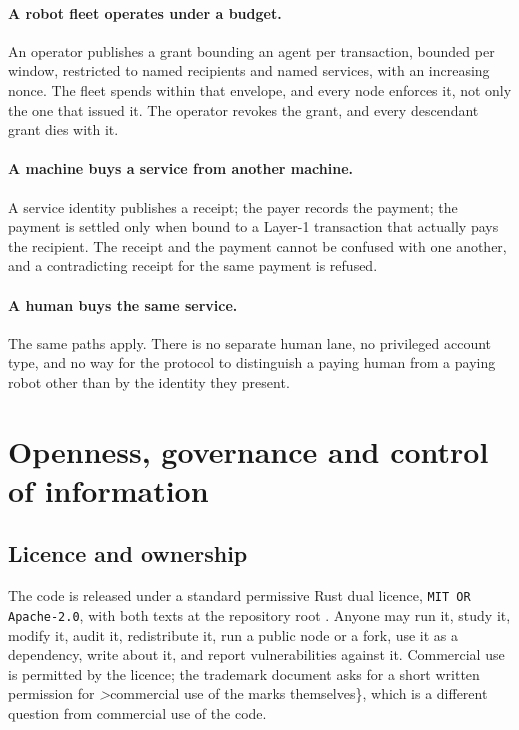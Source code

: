 \documentclass{article}
\begin{document}
\paragraph{A robot fleet operates under a budget.} An operator publishes a grant
bounding an agent per transaction, bounded per window, restricted to named
recipients and named services, with an increasing nonce. The fleet spends
within that envelope, and every node enforces it, not only the one that issued
it. The operator revokes the grant, and every descendant grant dies with it.

\paragraph{A machine buys a service from another machine.} A service identity
publishes a receipt; the payer records the payment; the payment is settled
only when bound to a Layer-1 transaction that actually pays the recipient. The
receipt and the payment cannot be confused with one another, and a
contradicting receipt for the same payment is refused.

\paragraph{A human buys the same service.} The same paths apply. There is no
separate human lane, no privileged account type, and no way for the protocol
to distinguish a paying human from a paying robot other than by the identity
they present.


\section{Openness, governance and control of information}
\label{sec:governance}

\subsection{Licence and ownership}

The code is released under a standard permissive Rust dual licence,
\texttt{MIT OR Apache-2.0}, with both texts at the repository root
\cite{jounit-repo}. Anyone may run it, study it, modify it, audit it,
redistribute it, run a public node or a fork, use it as a dependency, write
about it, and report vulnerabilities against it. Commercial use is permitted by
the licence; the trademark document asks for a short written permission for
\emph>commercial use of the marks themselves\}, which is a different question
from commercial use of the code.
\end{document}
